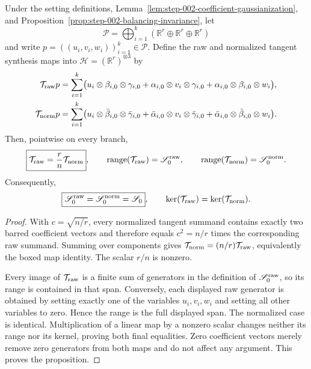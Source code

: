 \begin{proposition}
\label{prop:step-005-synthesis-scaling}
Under the setting definitions, Lemma~\ref{lem:step-002-coefficient-gaussianization}, and Proposition~\ref{prop:step-002-balancing-invariance}, let
\[
  \mathcal P=\bigoplus_{i=1}^k
    (\mathbb R^r\oplus\mathbb R^r\oplus\mathbb R^r)
\]
and write \(p=((u_i,v_i,w_i))_{i=1}^k\in\mathcal P\). Define the raw and
normalized tangent synthesis maps into
\(\mathcal H=(\mathbb R^r)^{\otimes3}\) by
\[
\begin{aligned}
  \mathcal T_{\rm raw}p
  &=\sum_{i=1}^k\bigl(
      u_i\otimes\beta_{i,0}\otimes\gamma_{i,0}
      +\alpha_{i,0}\otimes v_i\otimes\gamma_{i,0}
      +\alpha_{i,0}\otimes\beta_{i,0}\otimes w_i\bigr),\\
  \mathcal T_{\rm norm}p
  &=\sum_{i=1}^k\bigl(
      u_i\otimes\bar\beta_{i,0}\otimes\bar\gamma_{i,0}
      +\bar\alpha_{i,0}\otimes v_i\otimes\bar\gamma_{i,0}
      +\bar\alpha_{i,0}\otimes\bar\beta_{i,0}\otimes w_i\bigr).
\end{aligned}
\]
Then, pointwise on every branch,
\[
  \boxed{\mathcal T_{\rm raw}=\frac rn\mathcal T_{\rm norm}},
  \qquad
  \operatorname{range}(\mathcal T_{\rm raw})
    =\mathscr S_0^{\rm raw},
  \qquad
  \operatorname{range}(\mathcal T_{\rm norm})
    =\mathscr S_0^{\rm norm}.
\]
Consequently,
\[
  \boxed{\mathscr S_0^{\rm raw}=\mathscr S_0^{\rm norm}=\mathscr S_0},
  \qquad
  \ker(\mathcal T_{\rm raw})=\ker(\mathcal T_{\rm norm}).
\]

\end{proposition}

\begin{proof}
With \(c=\sqrt{n/r}\), every normalized tangent
summand contains exactly two barred coefficient vectors and therefore equals
\(c^2=n/r\) times the corresponding raw summand. Summing over components
gives \(\mathcal T_{\rm norm}=(n/r)\mathcal T_{\rm raw}\), equivalently the
boxed map identity. The scalar \(r/n\) is nonzero.

Every image of \(\mathcal T_{\rm raw}\) is a finite sum of generators in the
definition of \(\mathscr S_0^{\rm raw}\), so its range is contained in that
span. Conversely, each displayed raw generator is obtained by setting exactly
one of the variables \(u_i,v_i,w_i\) and setting all other variables to zero.
Hence the range is the full displayed span. The normalized case is identical.
Multiplication of a linear map by a nonzero scalar changes neither its range
nor its kernel, proving both final equalities. Zero coefficient vectors merely
remove zero generators from both maps and do not affect any argument. This
proves the proposition. 

\end{proof}


